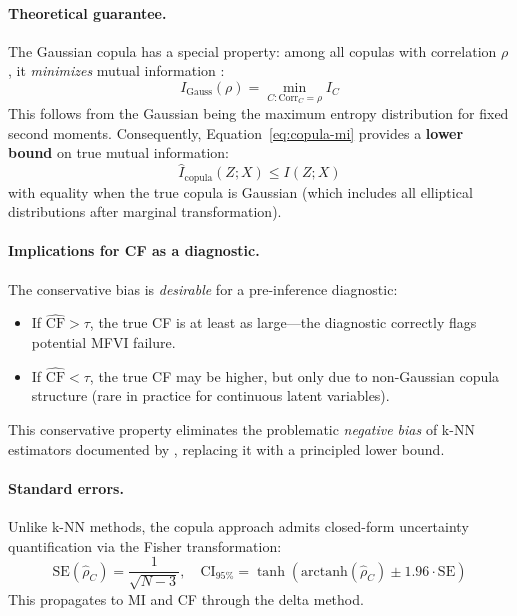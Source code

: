 \documentclass[10pt]{article} %
\theoremstyle{plain}
\theoremstyle{definition}
\newcommand{\CF}{\mathrm{CF}}
\newcommand{\MI}{I}
\begin{document}
\paragraph{Theoretical guarantee.} The Gaussian copula has a special property: among all copulas with correlation $\rho$, it \emph{minimizes} mutual information \citep{joe1989estimation}:
\begin{equation}
\MI_{\text{Gauss}}(\rho) = \min_{C: \text{Corr}_C = \rho} \MI_C
\label{eq:minimum-mi}
\end{equation}
This follows from the Gaussian being the maximum entropy distribution for fixed second moments. Consequently, Equation~\eqref{eq:copula-mi} provides a \textbf{lower bound} on true mutual information:
\begin{equation}
\widehat{\MI}_{\text{copula}}(Z; X) \leq \MI(Z; X)
\end{equation}
with equality when the true copula is Gaussian (which includes all elliptical distributions after marginal transformation).

\paragraph{Implications for CF as a diagnostic.} The conservative bias is \emph{desirable} for a pre-inference diagnostic:
\begin{itemize}[nosep]
    \item If $\widehat{\CF} > \tau$, the true CF is at least as large---the diagnostic correctly flags potential MFVI failure.
    \item If $\widehat{\CF} < \tau$, the true CF may be higher, but only due to non-Gaussian copula structure (rare in practice for continuous latent variables).
\end{itemize}
This conservative property eliminates the problematic \emph{negative bias} of k-NN estimators documented by \citet{vandenberg2025linfoot}, replacing it with a principled lower bound.

\paragraph{Standard errors.} Unlike k-NN methods, the copula approach admits closed-form uncertainty quantification via the Fisher transformation:
\begin{equation}
\text{SE}(\hat{\rho}_C) = \frac{1}{\sqrt{N-3}}, \quad \text{CI}_{95\%} = \tanh\left(\text{arctanh}(\hat{\rho}_C) \pm 1.96 \cdot \text{SE}\right)
\end{equation}
This propagates to MI and CF through the delta method.
\end{document}
